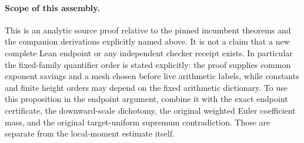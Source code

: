\paragraph{Scope of this assembly.}
This is an analytic source proof relative to the pinned incumbent
theorems and the companion derivations explicitly named above. It is
not a claim that a new complete Lean endpoint or any independent
checker receipt exists. In particular the fixed-family quantifier
order is stated explicitly: the proof supplies common exponent savings
and a mesh chosen before live arithmetic labels, while constants and
finite height orders may depend on the fixed arithmetic dictionary.
To use this proposition in the endpoint argument, combine it with
the exact endpoint certificate, the downward-scale dichotomy,
the original weighted Euler coefficient mass, and the original
target-uniform supremum contradiction. Those are separate from the
local-moment estimate itself.
